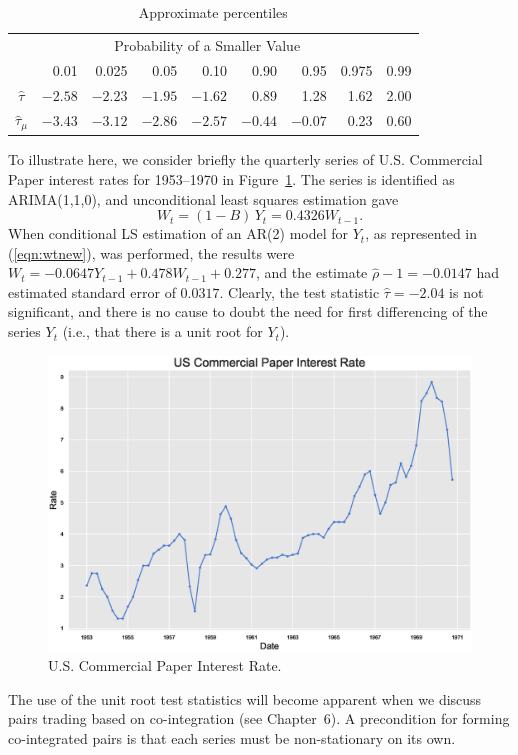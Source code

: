 	\begin{table}[!ht]
	\centering
	\caption{Approximate percentiles \label{tab:percentiles}}
	\begin{tabular}{crrrrrrrr}
	& \multicolumn{7}{c}{Probability of a Smaller Value} \\
	& 0.01 & 0.025 & 0.05 & 0.10 & 0.90 & 0.95 & 0.975 & 0.99 \\ \hline
	$\hat{\tau}$ & $-2.58$ & $-2.23$ & $-1.95$ & $-1.62$  &0.89 & 1.28 & 1.62 & 2.00 \\
	$\hat{\tau}_\mu$ & $-3.43$ & $-3.12$ & $-2.86$ & $-2.57$ & $-0.44$ & $-0.07$ & 0.23 & 0.60
	\end{tabular}
	\end{table}


\begin{ex} 
To illustrate here, we consider briefly the quarterly series of U.S. Commercial Paper interest rates for 1953--1970 in Figure~\ref{fig:exchratefirst}. The series is identified as ARIMA(1,1,0), and unconditional least squares estimation gave 
	\[
	W_t = (1 - B)\, Y_t = 0.4326 W_{t-1}.
	\]
When conditional LS estimation of an AR(2) model for $Y_t$, as represented in (\ref{eqn:wtnew}), was performed, the results were $W_t = -0.0647Y_{t-1} + 0.478 W_{t-1} + 0.277$, and the estimate $\hat{\rho} - 1 = -0.0147$ had estimated standard error of $0.0317$. Clearly, the test statistic $\hat{\tau} = -2.04$ is not significant, and there is no cause to doubt the need for first differencing of the series $Y_t$ (i.e., that there is a unit root for $Y_t$).
	\begin{figure}[!ht]
	\centering
	\includegraphics[width=\textwidth]{chapters/chapter_uvts/figures/uscompaper.eps}
	\caption{U.S. Commercial Paper Interest Rate.\label{fig:exchratefirst}}
	\end{figure}
The use of the unit root test statistics will become apparent when we discuss pairs trading based on co-integration (see Chapter~6). A precondition for forming co-integrated pairs is that each series must be non-stationary on its own. 
\end{ex}


